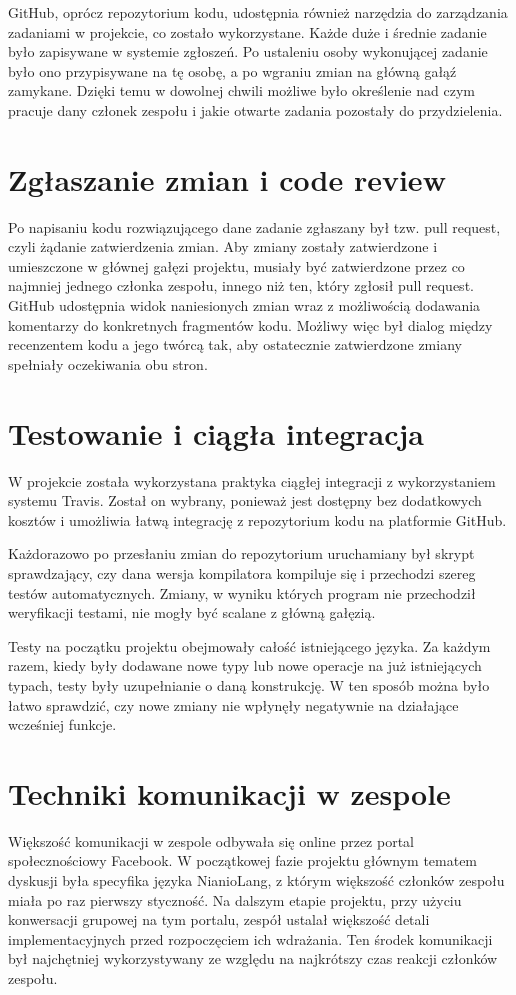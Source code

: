 \documentclass[licencjacka]{pracamgr}
\begin{document}
GitHub, oprócz repozytorium kodu, udostępnia również narzędzia do zarządzania zadaniami
w projekcie, co zostało wykorzystane. Każde duże i średnie zadanie było zapisywane
w systemie zgłoszeń. Po ustaleniu osoby wykonującej zadanie było ono przypisywane
na tę osobę, a po wgraniu zmian na główną gałąź zamykane.
Dzięki temu w dowolnej chwili możliwe było określenie nad czym pracuje dany członek
zespołu i jakie otwarte zadania pozostały do przydzielenia.

\section{Zgłaszanie zmian i code review}
Po napisaniu kodu rozwiązującego dane zadanie zgłaszany był tzw. pull request,
czyli żądanie zatwierdzenia zmian. Aby zmiany zostały zatwierdzone i umieszczone
w głównej gałęzi projektu, musiały być zatwierdzone przez co najmniej jednego członka
zespołu, innego niż ten, który zgłosił pull request. GitHub udostępnia widok naniesionych zmian
wraz z możliwością dodawania komentarzy do konkretnych fragmentów kodu. Możliwy więc
był dialog między recenzentem kodu a jego twórcą tak, aby ostatecznie zatwierdzone
zmiany spełniały oczekiwania obu stron.

\section{Testowanie i ciągła integracja}
W projekcie została wykorzystana praktyka ciągłej integracji z wykorzystaniem systemu Travis.
Został on wybrany, ponieważ jest dostępny bez dodatkowych kosztów i umożliwia łatwą integrację z repozytorium kodu
na platformie GitHub.

Każdorazowo po przesłaniu zmian do repozytorium uruchamiany był skrypt sprawdzający, czy dana wersja kompilatora
kompiluje się i przechodzi szereg testów automatycznych.
Zmiany, w wyniku których program nie przechodził weryfikacji testami, nie mogły być scalane z główną gałęzią.

Testy na początku projektu obejmowały całość istniejącego języka.
Za każdym razem, kiedy były dodawane nowe typy lub nowe operacje na już istniejących typach,
testy były uzupełnianie o daną konstrukcję.
W ten sposób można było łatwo sprawdzić, czy nowe zmiany nie wpłynęły negatywnie na działające wcześniej funkcje.

\section{Techniki komunikacji w zespole}
Większość komunikacji w zespole odbywała się online przez portal społecznościowy Facebook.
W początkowej fazie projektu głównym tematem dyskusji była specyfika języka NianioLang,
z którym większość członków zespołu miała po raz pierwszy styczność.
Na dalszym etapie projektu, przy użyciu konwersacji grupowej na tym portalu, zespół
ustalał większość detali implementacyjnych przed rozpoczęciem ich wdrażania.
Ten środek komunikacji był najchętniej wykorzystywany ze względu na najkrótszy czas
reakcji członków zespołu.
\end{document}
